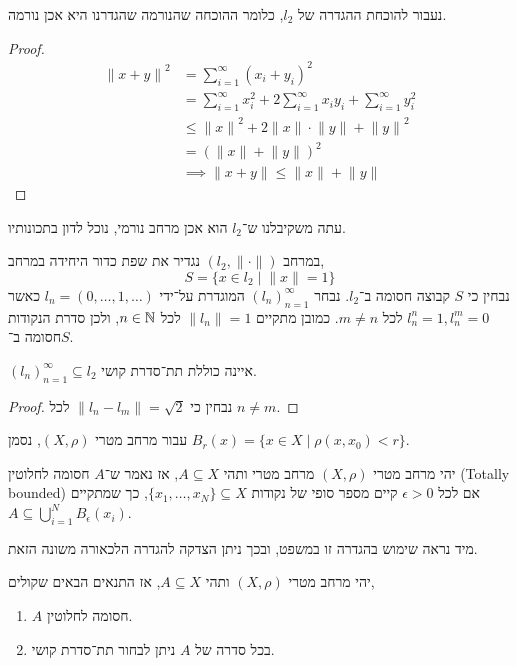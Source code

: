 נעבור להוכחת ההגדרה של $l_2$, כלומר ההוכחה שהנורמה שהגדרנו היא אכן נורמה.
\begin{proof}
	\begin{align*}
		{\lVert x + y \rVert}^2
		& = \sum_{i = 1}^{\infty} {(x_i + y_i)}^2 \\
		& = \sum_{i = 1}^{\infty} x_i^2 + 2 \sum_{i = 1}^{\infty} x_i y_i + \sum_{i = 1}^{\infty} y_i^2 \\
		& \le {\lVert x\rVert}^2 + 2 \lVert x \rVert \cdot \lVert y \rVert + {\lVert y \rVert}^2 \\
		& = {(\lVert x \rVert + \lVert y \rVert)}^2 \\
		& \implies \lVert x + y \rVert \le \lVert x \rVert + \lVert y \rVert
	\end{align*}
\end{proof}
עתה משקיבלנו ש־$l_2$ הוא אכן מרחב נורמי, נוכל לדון בתכונותיו.
\begin{example}
	במרחב $(l_2, \lVert \cdot \rVert)$ נגדיר את שפת כדור היחידה במרחב,
	\[
		S = \{ x \in l_2 \mid \lVert x \rVert = 1 \}
	\]
	נבחין כי $S$ קבוצה חסומה ב־$l_2$.
	נבחר ${(l_n)}_{n = 1}^\infty$ המוגדרת על־ידי $l_n = (0, \dots, 1, \dots)$ כאשר $l_n^n = 1, l_n^m = 0$ לכל $m \ne n$.
	כמובן מתקיים $\lVert l_n \rVert = 1$ לכל $n \in \mathbb{N}$, ולכן סדרת הנקודות חסומה ב־$S$.
\end{example}
\begin{proposition}
	${(l_n)}_{n = 1}^\infty \subseteq l_2$ איינה כוללת תת־סדרת קושי.
\end{proposition}
\begin{proof}
	נבחין כי $\lVert l_n - l_m \rVert = \sqrt{2}$ לכל $n \ne m$.
\end{proof}
\begin{notation}[כדור]
	עבור מרחב מטרי $(X, \rho)$, נסמן $B_r(x) = \{ x \in X \mid \rho(x, x_0) < r \}$.
\end{notation}
\begin{definition}
	יהי מרחב מטרי $(X, \rho)$ מרחב מטרי ותהי $A \subseteq X$, אז נאמר ש־$A$ חסומה לחלוטין (Totally bounded) אם לכל $\epsilon > 0$ קיים מספר סופי של נקודות $\{ x_1, \dots, x_N \} \subseteq X$,
	כך שמתקיים $A \subseteq \bigcup_{i = 1}^N B_\epsilon(x_i)$.
\end{definition}
מיד נראה שימוש בהגדרה זו במשפט, ובכך ניתן הצדקה להגדרה הלכאורה משונה הזאת.
\begin{theorem}\label{totally_bounded_set_equivalecy_theorem}
	יהי מרחב מטרי $(X, \rho)$ ותהי $A \subseteq X$, אז התנאים הבאים שקולים,
	\begin{enumerate}
		\item $A$ חסומה לחלוטין.
		\item בכל סדרה של $A$ ניתן לבחור תת־סדרת קושי.
	\end{enumerate}
\end{theorem}
